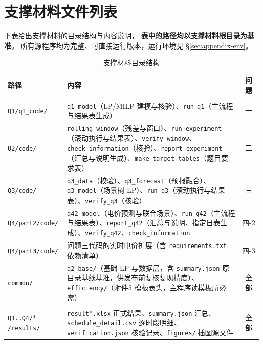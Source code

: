 \appendix
\renewcommand{\thesection}{附录 \Alph{section}}
\section{支撑材料文件列表}

下表给出支撑材料的目录结构与内容说明，
\textbf{表中的路径均以支撑材料根目录为基准}。
所有源程序均为完整、可直接运行版本，运行环境见 \S\ref{sec:appendix-env}。

\begin{table}[H]
\centering
\footnotesize
\setlength{\tabcolsep}{5pt}
\renewcommand{\arraystretch}{1.15}
\caption{支撑材料目录结构}
\label{tab:appendix-files}
\begin{tabularx}{\textwidth}{@{}>{\raggedright\arraybackslash}p{3.55cm} X c@{}}
\toprule
路径 & 内容 & 问题 \\
\midrule
\multicolumn{3}{@{}l}{\textbf{一、源程序}} \\
\midrule
\texttt{Q1/q1\_code/} & \texttt{q1\_model}（LP/MILP 建模与核验）、\texttt{run\_q1}（主流程与结果表生成） & 一 \\
\midrule
\texttt{Q2/code/} & \texttt{rolling\_window}（残差与窗口）、\texttt{run\_experiment}（滚动执行与结果表）、\texttt{verify\_window}、\texttt{check\_information}（核验）、\texttt{report\_experiment}（汇总与说明生成）、\texttt{make\_target\_tables}（题目要求表） & 二 \\
\midrule
\texttt{Q3/code/} & \texttt{q3\_data}（校验）、\texttt{q3\_forecast}（预报融合）、\texttt{q3\_model}（场景树 LP）、\texttt{run\_q3}（滚动执行与结果表）、\texttt{verify\_q3}（核验） & 三 \\
\midrule
\texttt{Q4/part2/code/} & \texttt{q42\_model}（电价预测与联合场景）、\texttt{run\_q42}（主流程与结果表）、\texttt{report\_q42}（汇总与说明、指定日表生成）、\texttt{verify\_q42}、\texttt{check\_information} & 四-2 \\
\midrule
\texttt{Q4/part3/code/} & 问题三代码的实时电价扩展（含 \texttt{requirements.txt} 依赖清单） & 四-3 \\
\midrule
\texttt{common/} & \texttt{q2\_base/}（基础 LP 与数据层，含 \texttt{summary.json} 原目录基线基准，供发布前复核复现精度）、\texttt{efficiency/}（附件5 模板表头，主程序读模板所必需） & 全部 \\
\midrule
\multicolumn{3}{@{}l}{\textbf{二、结果与图表}} \\
\midrule
\texttt{Q1..Q4/\(\ast\)/results/} & \texttt{result\(\ast\).xlsx} 正式结果、\texttt{summary.json} 汇总、\texttt{schedule\_detail.csv} 逐时段明细、\texttt{verification.json} 核验记录、\texttt{figures/} 插图源文件 & 全部 \\

\end{tabularx}
\end{table}
